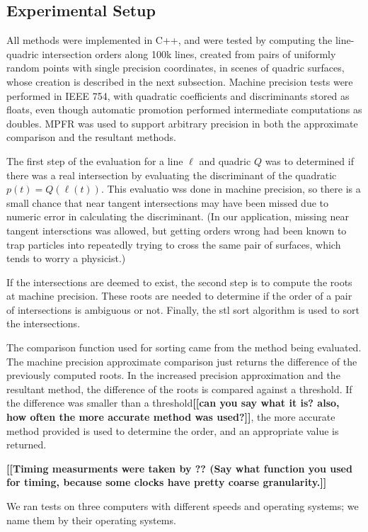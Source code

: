 \documentclass{cccg16}
\def\Jack#1{{\bf [[#1]]}\ignorespaces}
\begin{document}
\subsection{Experimental Setup}
All methods were implemented in C++, and were tested by computing the
line-quadric intersection orders along 100k lines, created from pairs
of uniformly random points with single precision coordinates, in
scenes of quadric surfaces, whose creation is described in the next
subsection.  Machine precision tests were performed in IEEE 754, with
quadratic coefficients and discriminants stored as floats, even though
automatic promotion performed intermediate computations as doubles.
MPFR\cite{mpfr} was used to support arbitrary precision in both the
approximate comparison and the resultant methods.

The first step of the evaluation for a line $\ell$ and quadric $Q$ was
to determined if there was a real intersection by evaluating the
discriminant of the quadratic~$p(t)=Q(\ell(t))$.  This evaluatio wss
done in machine precision, so there is a small chance that near
tangent intersections may have been missed due to numeric error in
calculating the discriminant. (In our application, missing near
tangent intersctions was allowed, but getting orders wrong had been
known to trap particles into repeatedly trying to cross the same pair
of surfaces, which tends to worry a physicist.)

If the intersections are deemed to exist, the second step is to
compute the roots at machine precision.  These roots are needed to
determine if the order of a pair of intersections is ambiguous or not.
Finally, the stl sort algorithm is used to sort the intersections.

The comparison function used for sorting came from the  method being
evaluated.  The machine precision approximate comparison just returns
the difference of the previously computed roots.  In the increased
precision approximation and the resultant method, the difference of
the roots is compared against a threshold.  If the difference was
smaller than a threshold\Jack{can you say what it is?  also, how often the more accurate method was used?}, the more accurate method provided is used
to determine the order, and an appropriate value is returned.


\Jack{Timing measurments were taken by  ?? (Say what function you used for timing, because some clocks have pretty coarse granularity.}

We ran tests on three computers with different speeds and operating systems; we name them by their operating systems.
\end{document}
